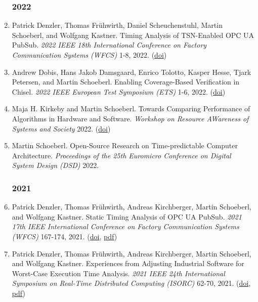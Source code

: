 \begin{enumerate}

\subsubsection*{2022}

\item Patrick Denzler, Thomas Fr\"uhwirth, Daniel Scheuchenstuhl, Martin Schoeberl, and Wolfgang Kastner.
 Timing Analysis of TSN-Enabled OPC UA PubSub.
 \emph{2022 IEEE 18th International Conference on Factory Communication Systems (WFCS)} 1-8, 2022.
(\href{http://dx.doi.org/10.1109/WFCS53837.2022.9779177}{doi})

\item Andrew Dobis, Hans Jakob Damsgaard, Enrico Tolotto, Kasper Hesse, Tjark Petersen, and Martin Schoeberl.
 Enabling Coverage-Based Verification in Chisel.
 \emph{2022 IEEE European Test Symposium (ETS)} 1-6, 2022.
(\href{http://dx.doi.org/10.1109/ETS54262.2022.9810435}{doi})

\item Maja H. Kirkeby and Martin Schoeberl.
 Towards Comparing Performance of Algorithms in Hardware and Software.
 \emph{Workshop on Resource AWareness of Systems and Society} 2022.
(\href{http://dx.doi.org/10.48550/ARXIV.2204.03394}{doi})

\item Martin Schoeberl.
 Open-Source Research on Time-predictable Computer Architecture.
 \emph{Proceedings of the 25th Euromicro Conference on Digital System Design (DSD)} 2022.



\subsubsection*{2021}

\item Patrick Denzler, Thomas Fr\"uhwirth, Andreas Kirchberger, Martin Schoeberl, and Wolfgang Kastner.
 Static Timing Analysis of OPC UA PubSub.
 \emph{2021 17th IEEE International Conference on Factory Communication Systems (WFCS)} 167-174, 2021.
(\href{http://dx.doi.org/10.1109/WFCS46889.2021.9483614}{doi}, \href{https://www.jopdesign.com/doc/OPC_UA_Pub_Sub_WCET.pdf}{pdf})

\item Patrick Denzler, Thomas Fr\"uhwirth, Andreas Kirchberger, Martin Schoeberl, and Wolfgang Kastner.
 Experiences from Adjusting Industrial Software for Worst-Case Execution Time Analysis.
 \emph{2021 IEEE 24th International Symposium on Real-Time Distributed Computing (ISORC)} 62-70, 2021.
(\href{http://dx.doi.org/10.1109/ISORC52013.2021.00019}{doi}, \href{https://www.jopdesign.com/doc/industswwcet.pdf}{pdf})


\end{enumerate}
